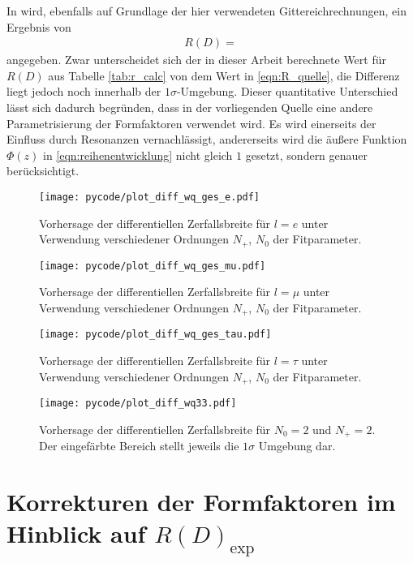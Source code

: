 In \cite{PhysRevD.92.034506} wird, ebenfalls auf Grundlage der hier verwendeten Gittereichrechnungen, ein Ergebnis von
\begin{align}
  \label{eqn:R_quelle}
  R(D) = 
\end{align}
angegeben.
Zwar unterscheidet sich der in dieser Arbeit berechnete Wert für $R(D)$ aus Tabelle \ref{tab:r_calc} von dem Wert in \eqref{eqn:R_quelle}, die Differenz liegt jedoch noch innerhalb der $\num{1}\sigma$-Umgebung.
Dieser quantitative Unterschied lässt sich dadurch begründen, dass in der vorliegenden Quelle eine andere Parametrisierung der Formfaktoren verwendet wird.
Es wird einerseits der Einfluss durch Resonanzen vernachlässigt, andererseits wird die äußere Funktion $\Phi(z)$ in \eqref{eqn:reihenentwicklung} nicht gleich $1$ gesetzt, sondern genauer berücksichtigt.

\begin{figure}
  \centering
  \texttt{[image: pycode/plot\_diff\_wq\_ges\_e.pdf]}
  \caption{Vorhersage der differentiellen Zerfallsbreite für $l=e$ unter Verwendung verschiedener Ordnungen $N_+$, $N_0$ der Fitparameter.}
  \label{fig:difwqe}
\end{figure}
\begin{figure}
  \centering
  \texttt{[image: pycode/plot\_diff\_wq\_ges\_mu.pdf]}
  \caption{Vorhersage der differentiellen Zerfallsbreite für $l=\mu$ unter Verwendung verschiedener Ordnungen $N_+$, $N_0$ der Fitparameter.}
  \label{fig:difwqmu}
\end{figure}
\begin{figure}
  \centering
  \texttt{[image: pycode/plot\_diff\_wq\_ges\_tau.pdf]}
  \caption{Vorhersage der differentiellen Zerfallsbreite für $l=\tau$ unter Verwendung verschiedener Ordnungen $N_+$, $N_0$ der Fitparameter.}
  \label{fig:difwqtau}
\end{figure}
\begin{figure}
  \centering
  \texttt{[image: pycode/plot\_diff\_wq33.pdf]}
  \caption{Vorhersage der differentiellen Zerfallsbreite für $N_0 = \num{2}$ und $N_+ = \num{2}$. Der eingefärbte Bereich stellt jeweils die $\num{1}\sigma$ Umgebung dar.}
  \label{fig:difwq33}
\end{figure}

\section{Korrekturen der Formfaktoren im Hinblick auf \texorpdfstring{$R(D)_\text{exp}$}{R(D)_exp}}

